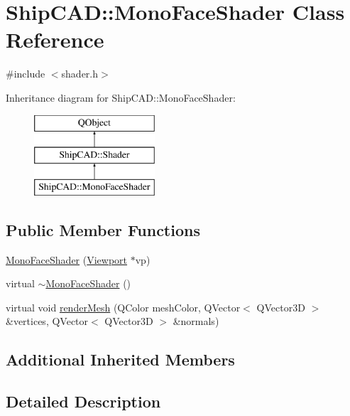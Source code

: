 \hypertarget{classShipCAD_1_1MonoFaceShader}{\section{Ship\-C\-A\-D\-:\-:Mono\-Face\-Shader Class Reference}
\label{classShipCAD_1_1MonoFaceShader}
}


{\ttfamily \#include $<$shader.\-h$>$}

Inheritance diagram for Ship\-C\-A\-D\-:\-:Mono\-Face\-Shader\-:\begin{figure}[H]
\begin{center}
\leavevmode
\includegraphics[height=3.000000cm]{classShipCAD_1_1MonoFaceShader}
\end{center}
\end{figure}
\subsection*{Public Member Functions}
\begin{DoxyCompactItemize}
\item 
\hyperlink{classShipCAD_1_1MonoFaceShader_a963aa389c930d6482a58f49b2ccb4473}{Mono\-Face\-Shader} (\hyperlink{classShipCAD_1_1Viewport}{Viewport} $\ast$vp)
\item 
virtual \hyperlink{classShipCAD_1_1MonoFaceShader_ab1f3cb853a5a2b04f9c4944d9eca30b4}{$\sim$\-Mono\-Face\-Shader} ()
\item 
virtual void \hyperlink{classShipCAD_1_1MonoFaceShader_a9a358ec63af4b067449e772cbc735d5a}{render\-Mesh} (Q\-Color mesh\-Color, Q\-Vector$<$ Q\-Vector3\-D $>$ \&vertices, Q\-Vector$<$ Q\-Vector3\-D $>$ \&normals)
\end{DoxyCompactItemize}
\subsection*{Additional Inherited Members}


\subsection{Detailed Description}


